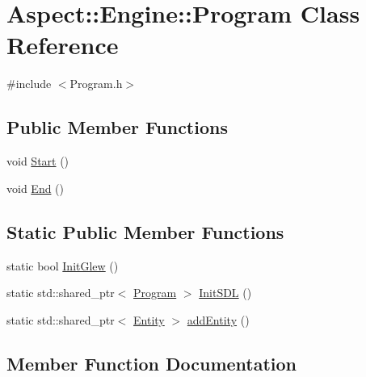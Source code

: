 \hypertarget{class_aspect_1_1_engine_1_1_program}{}\section{Aspect\+:\+:Engine\+:\+:Program Class Reference}
\label{class_aspect_1_1_engine_1_1_program}


{\ttfamily \#include $<$Program.\+h$>$}

\subsection*{Public Member Functions}
\begin{DoxyCompactItemize}
\item 
void \mbox{\hyperlink{class_aspect_1_1_engine_1_1_program_aee19a120d828c74bd868a62f33a61e57}{Start}} ()
\item 
void \mbox{\hyperlink{class_aspect_1_1_engine_1_1_program_aebf5093c9edb094862fc4fa0823d87e5}{End}} ()
\end{DoxyCompactItemize}
\subsection*{Static Public Member Functions}
\begin{DoxyCompactItemize}
\item 
static bool \mbox{\hyperlink{class_aspect_1_1_engine_1_1_program_ad43c625aadbe66c58cf2c89f3aea0b67}{Init\+Glew}} ()
\item 
static std\+::shared\+\_\+ptr$<$ \mbox{\hyperlink{class_aspect_1_1_engine_1_1_program}{Program}} $>$ \mbox{\hyperlink{class_aspect_1_1_engine_1_1_program_a0defbfe96a9811ed16b1d02d786caba0}{Init\+S\+DL}} ()
\item 
static std\+::shared\+\_\+ptr$<$ \mbox{\hyperlink{class_aspect_1_1_engine_1_1_entity}{Entity}} $>$ \mbox{\hyperlink{class_aspect_1_1_engine_1_1_program_a937df3d57a425f25be2f40c3dcaff072}{add\+Entity}} ()
\end{DoxyCompactItemize}


\subsection{Member Function Documentation}
\mbox{\label{class_aspect_1_1_engine_1_1_program_a937df3d57a425f25be2f40c3dcaff072}} 
